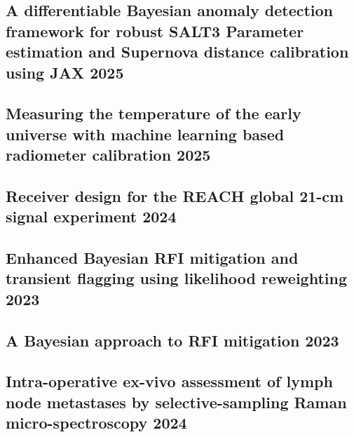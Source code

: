 \subsection{{A differentiable Bayesian anomaly detection framework for robust SALT3 Parameter estimation and Supernova distance calibration using JAX \hfill 2025}}
\vspace{8px}

\subsection{{Measuring the temperature of the early universe with machine learning based radiometer calibration \hfill 2025}}
\vspace{8px}

\subsection{{Receiver design for the REACH global 21-cm signal experiment \hfill 2024}}
\vspace{8px}

\subsection{{Enhanced Bayesian RFI mitigation and transient flagging using likelihood reweighting \hfill 2023}}
\vspace{8px}

\subsection{{A Bayesian approach to RFI mitigation \hfill 2023}}
\vspace{8px}

\subsection{{Intra-operative ex-vivo assessment of lymph node metastases by selective-sampling Raman micro-spectroscopy \hfill 2024}}
\vspace{8px}
